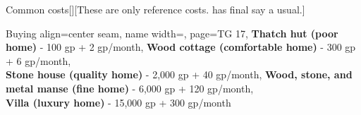 \begin{PageBack}
\begin{Tables}{\backTableHeight}
\begin{Table}{Common costs}[][These are only reference costs. \GM has final say a usual.]
\begin{entry}{Buying}{%
                align=center seam,
                name width=\turnLength,%
                page=TG 17,
            }
                \textbf{Thatch hut (poor home)} - 100 gp + 2 gp/month, \hfill
                \textbf{Wood cottage (comfortable home)} - 300 gp + 6 gp/month, \\
                \textbf{Stone house (quality home)} - 2,000 gp + 40 gp/month, \hfill
                \textbf{Wood, stone, and metal manse (fine home)} - 6,000 gp + 120 gp/month,\\
                \textbf{Villa (luxury home) } - 15,000 gp + 300 gp/month \hfill{}
            \end{entry}
        \end{Table}
    \end{Tables}%
\end{PageBack}%


